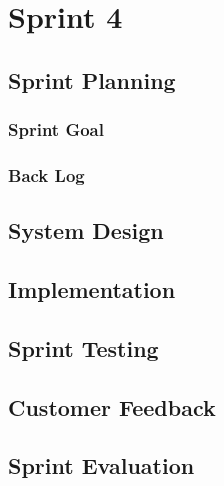 \chapter{Sprint 4}


\section{Sprint Planning}

\subsection{Sprint Goal}

\subsection{Back Log}


\section{System Design}


\section{Implementation}


\section{Sprint Testing}


\section{Customer Feedback}


\section{Sprint Evaluation}



